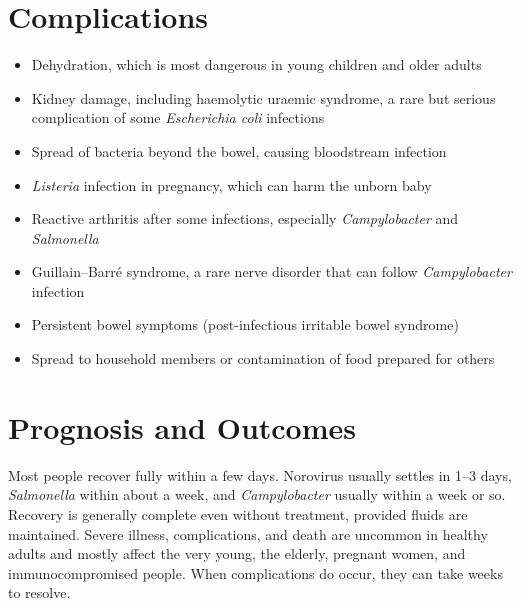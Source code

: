 \section*{Complications}
\begin{itemize}
    \item Dehydration, which is most dangerous in young children and older adults
    \item Kidney damage, including haemolytic uraemic syndrome, a rare but serious complication of some \textit{Escherichia coli} infections
    \item Spread of bacteria beyond the bowel, causing bloodstream infection
    \item \textit{Listeria} infection in pregnancy, which can harm the unborn baby
    \item Reactive arthritis after some infections, especially \textit{Campylobacter} and \textit{Salmonella}
    \item Guillain--Barr\'e syndrome, a rare nerve disorder that can follow \textit{Campylobacter} infection
    \item Persistent bowel symptoms (post-infectious irritable bowel syndrome)
    \item Spread to household members or contamination of food prepared for others
\end{itemize}

\section*{Prognosis and Outcomes}
Most people recover fully within a few days. Norovirus usually settles in 1--3 days, \textit{Salmonella} within about a week, and \textit{Campylobacter} usually within a week or so. Recovery is generally complete even without treatment, provided fluids are maintained. Severe illness, complications, and death are uncommon in healthy adults and mostly affect the very young, the elderly, pregnant women, and immunocompromised people. When complications do occur, they can take weeks to resolve.

